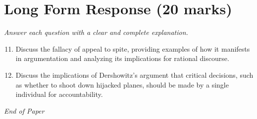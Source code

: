 \documentclass[12pt]{article}
\begin{document}
\section*{Long Form Response (20 marks)}
\textit{Answer each question with a clear and complete explanation.}
\begin{enumerate}[label=\arabic*.]
\setcounter{enumi}{10}
\item Discuss the fallacy of appeal to spite, providing examples of how it manifests in argumentation and analyzing its implications for rational discourse.
\item Discuss the implications of Dershowitz's argument that critical decisions, such as whether to shoot down hijacked planes, should be made by a single individual for accountability.
\end{enumerate}

\vfill
\noindent\textit{End of Paper}
\end{document}
